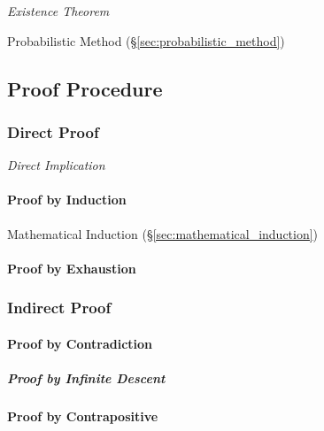 \emph{Existence Theorem}

Probabilistic Method (\S\ref{sec:probabilistic_method})



\subsection{Proof Procedure}\label{sec:proof_procedure}

\subsubsection{Direct Proof}\label{sec:direct_proof}

\emph{Direct Implication}



\paragraph{Proof by Induction}\label{sec:induction_proof}\hfill

Mathematical Induction (\S\ref{sec:mathematical_induction})



\paragraph{Proof by Exhaustion}\label{sec:exhaustion_proof}\hfill



\subsubsection{Indirect Proof}\label{sec:indirect_proof}

\paragraph{Proof by Contradiction}\label{sec:contradiction_proof}\hfill

\subparagraph{Proof by Infinite Descent}\label{sec:infinite_descent}\hfill

\paragraph{Proof by Contrapositive}\label{sec:contrapositive_proof}\hfill



